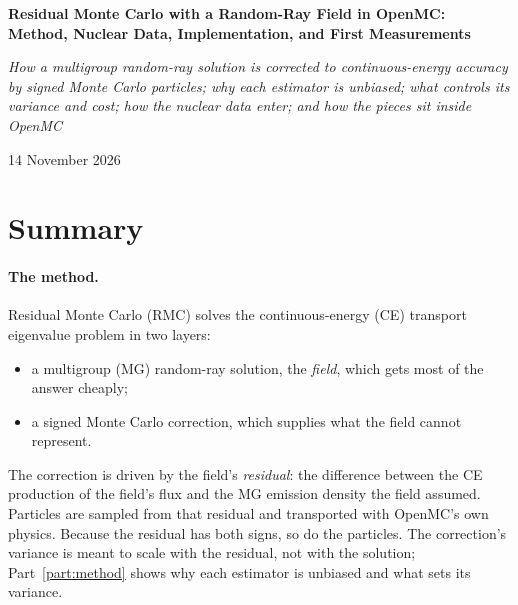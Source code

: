\documentclass[11pt]{article}
\theoremstyle{definition}
\begin{document}
\thispagestyle{empty}
{\Large\bfseries Residual Monte Carlo with a Random-Ray Field in OpenMC:\\[2pt]
Method, Nuclear Data, Implementation, and First Measurements\par}
\vspace{0.6em}
{\itshape How a multigroup random-ray solution is corrected to continuous-energy accuracy by
signed Monte Carlo particles; why each estimator is unbiased; what controls its variance and
cost; how the nuclear data enter; and how the pieces sit inside OpenMC\par}
\vspace{0.6em}
14 November 2026\par
\vspace{1em}
\tableofcontents
\clearpage

\section*{Summary}

\paragraph{The method.} Residual Monte Carlo (RMC) solves the continuous-energy (CE) transport
eigenvalue problem in two layers:
\begin{itemize}
\item a multigroup (MG) random-ray solution, the \emph{field}, which gets most of the answer cheaply;
\item a signed Monte Carlo correction, which supplies what the field cannot represent.
\end{itemize}
The correction is driven by the field's \emph{residual}: the difference between the CE production of
the field's flux and the MG emission density the field assumed. Particles are sampled from that
residual and transported with OpenMC's own physics. Because the residual has both signs, so do the
particles. The correction's variance is meant to scale with the residual, not with the solution;
Part~\ref{part:method} shows why each estimator is unbiased and what sets its variance.
\end{document}

